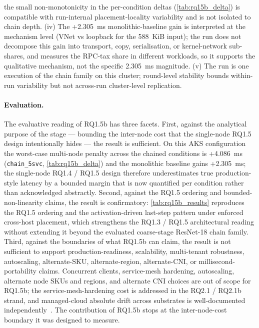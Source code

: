 the small non-monotonicity in the per-condition deltas
(\cref{tab:rq15b_delta}) is compatible with run-internal
placement-locality variability and is not isolated to chain depth. (iv)
The +2.305~ms monolithic-baseline gain is interpreted at the mechanism
level (VNet vs loopback for the 588~KiB input); the run does not
decompose this gain into transport, copy, serialisation, or
kernel-network sub-shares, and \cite{rpc_overhead_hotos25} measures the
RPC-tax share in different workloads, so it supports the qualitative
mechanism, not the specific 2.305~ms magnitude. (v) The run is one
execution of the chain family on this cluster; round-level stability
bounds within-run variability but not across-run cluster-level
replication.

\paragraph{Evaluation.}
The evaluative reading of RQ1.5b has three facets. First, against the
analytical purpose of the stage --- bounding the inter-node cost that
the single-node RQ1.5 design intentionally hides --- the result is
sufficient. On this AKS configuration the worst-case multi-node penalty
across the chained conditions is +4.086~ms (\texttt{chain\_5svc},
\cref{tab:rq15b_delta}) and the monolithic baseline gains +2.305~ms; the
single-node RQ1.4 / RQ1.5 design therefore underestimates true
production-style latency by a bounded margin that is now quantified per
condition rather than acknowledged abstractly. Second, against the
RQ1.5 ordering and bounded-non-linearity claims, the result is
confirmatory: \cref{tab:rq15b_results} reproduces the RQ1.5 ordering and
the activation-driven last-step pattern under enforced cross-host
placement, which strengthens the RQ1.3 / RQ1.5 architectural reading
without extending it beyond the evaluated coarse-stage ResNet-18 chain
family. Third, against the boundaries of what RQ1.5b can claim, the
result is not sufficient to support production-readiness, scalability,
multi-tenant robustness, autoscaling, alternate-SKU, alternate-region,
alternate-CNI, or millisecond-portability claims. Concurrent clients,
service-mesh hardening, autoscaling, alternate node SKUs and regions,
and alternate CNI choices are out of scope for RQ1.5b; the
service-mesh-hardening cost is addressed in the RQ2.1 / RQ2.1b strand,
and managed-cloud absolute drift across substrates is well-documented
independently~\cite{managed_k8s_perf,virtualization_costs,cni_k8s_ic2e21,%
noise_in_clouds}. The contribution of RQ1.5b stops at the
inter-node-cost boundary it was designed to measure.

